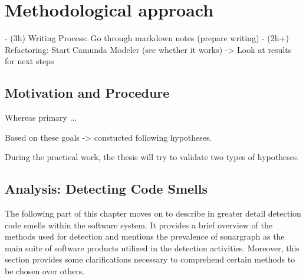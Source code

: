 \chapter{Methodological approach}
- (3h) Writing Process: Go through markdown notes (prepare writing)
- (2h+) Refactoring: Start Camunda Modeler (see whether it works)
	-> Look at results for next steps


\section{Motivation and Procedure}
% 
% 

%
%





Whereas primary ...





Based on these goals -> constucted following hypotheses.

During the practical work, 
	the thesis will try to validate two types of hypotheses.



\section{Analysis: Detecting Code Smells}

The following part of this chapter moves on to describe in greater detail detection code smells within the software system. It provides a brief overview of the methods used for detection and mentions the prevalence of sonargraph as the main suite of software products utilized in the detection activities. Moreover, this section provides some clarifications necessary to comprehend certain methods to be chosen over others.

